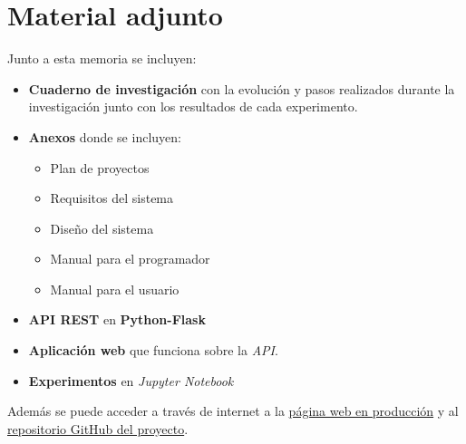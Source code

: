 \section{Material adjunto}
Junto a esta memoria se incluyen:

\begin{itemize}
	\item \textbf{Cuaderno de investigación} con la evolución y pasos realizados durante la investigación junto con los resultados de cada experimento.
	\item \textbf{Anexos} donde se incluyen:
		\begin{itemize}
			\item Plan de proyectos
			\item Requisitos del sistema
			\item Diseño del sistema
			\item Manual para el programador
			\item Manual para el usuario
		\end{itemize}
	\item \textbf{API REST} en \textbf{Python-Flask}
	\item \textbf{Aplicación web} que funciona sobre la \textit{API}.
	\item \textbf{Experimentos} en \textit{Jupyter Notebook}
\end{itemize}

Además se puede acceder a través de internet a la \href{https://ubu.joselucross.com}{ página web en producción} y al \href{https://github.com/jlgarridol/TFG-Smartbeds}{repositorio GitHub del proyecto}.